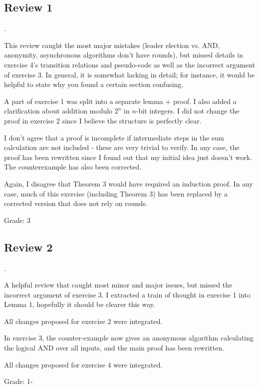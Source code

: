 \subsection{Review 1}.

This review caught the most major mistakes (leader election vs. AND, anonymity,
asynchronous algorithms don't have rounds), but missed details in exercise
4's transition relations and pseudo-code as well as the incorrect argument of exercise 3.
In general, it is somewhat lacking in detail;
for instance, it would be helpful to state why you found a certain section
confusing.

A part of exercise 1 was split into a separate lemma + proof. I also added a 
clarification about addition modulo $2^n$ in $n$-bit integers. I did not change
the proof in exercise 2 since I believe the structure is perfectly clear.

I don't agree that a proof is incomplete if intermediate steps in the sum
calculation are not included - these are very trivial to verify. In any case,
the proof has been rewritten since I found out that my initial idea
just doesn't work. The counterexample has also been corrected.

Again, I disagree that Theorem 3 would have required an induction proof. In any case,
much of this exercise (including Theorem 3) has been replaced by a corrected
version that does not rely on rounds.

Grade: 3

\subsection{Review 2}.

A helpful review that caught most minor and major issues, but missed the incorrect 
argument of exercise 3. I extracted a train of
thought in exercise 1 into Lemma 1, hopefully it should be clearer this way.

All changes proposed for exercise 2 were integrated.

In exercise 3, the counter-example
now gives an anonymous algorithm calculating the logical AND over all inputs,
and the main proof has been rewritten.

All changes proposed for exercise 4 were integrated.

Grade: 1-
